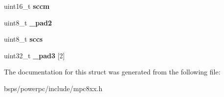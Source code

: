 \begin{DoxyCompactItemize}
uint16\+\_\+t {\bfseries sccm}
\item 
\mbox{\label{structm8xxSCCRegisters___ae6b66eea2eefdbc75118f26776451a15}} 
uint8\+\_\+t {\bfseries \+\_\+pad2}
\item 
\mbox{\label{structm8xxSCCRegisters___a326d4d1e93f5c158c4fb6fd607d918dd}} 
uint8\+\_\+t {\bfseries sccs}
\item 
\mbox{\label{structm8xxSCCRegisters___af5fe9249bf2cac94e3eeff243d1e0371}} 
uint32\+\_\+t {\bfseries \+\_\+pad3} \mbox{[}2\mbox{]}
\end{DoxyCompactItemize}


The documentation for this struct was generated from the following file\+:\begin{DoxyCompactItemize}
\item 
bsps/powerpc/include/mpc8xx.\+h\end{DoxyCompactItemize}
